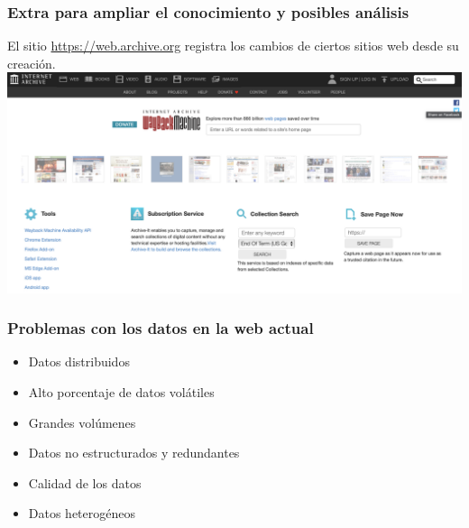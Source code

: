 \documentclass[
10pt, %
aspectratio=169, %
]{beamer}
\begin{document}
	\begin{frame}
		
		\frametitle{Extra para ampliar el conocimiento y posibles análisis}
		
		El sitio \url{https://web.archive.org} registra los cambios de ciertos sitios web desde su creación. \\[2mm]
		
		\centering
		\includegraphics[scale=0.25]{sitio.png} 
		
	\end{frame}
	
	\begin{frame}
		
		\frametitle{Problemas con los datos en la web actual}
		
		\begin{itemize}
			\item Datos distribuidos
			\item Alto porcentaje de datos volátiles
			\item Grandes volúmenes
			\item Datos no estructurados y redundantes
			\item Calidad de los datos
			\item Datos heterogéneos
		\end{itemize}
		
	\end{frame}
	
\end{document}
